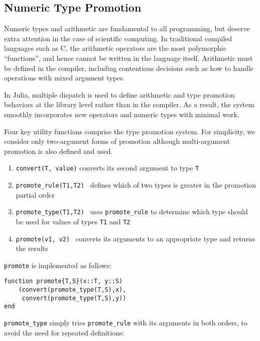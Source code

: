 \documentclass[9pt]{sigplanconf}
\begin{document}

\subsection{Numeric Type Promotion}

Numeric types and arithmetic are fundamental to all programming, but deserve
extra attention in the case of scientific computing.
In traditional compiled languages such as C, the arithmetic operators are the
most polymorphic ``functions'', and hence cannot be written in the language
itself. Arithmetic must be defined in the compiler, including contentious
decisions such as how to handle operations with mixed argument types.

In Julia, multiple dispatch is used to define arithmetic and type
promotion behaviors at the library level rather than in the compiler.
As a result, the system smoothly incorporates new
operators and numeric types with minimal work.

Four key utility functions comprise the type promotion system.
For simplicity, we consider only two-argument forms of promotion
although multi-argument promotion is also defined and used.

\begin{enumerate}
\item {\tt convert(T, value)} converts its second argument to type {\tt T}
\item {\tt promote\_rule(T1,T2) } defines which of two types is greater in
the promotion partial order
\item {\tt promote\_type(T1,T2) } uses {\tt promote\_rule} to determine which
type should be used for values of types {\tt T1} and {\tt T2}
\item {\tt promote(v1, v2) } converts its arguments to an appropriate type
and returns the results
\end{enumerate}

{\tt promote} is implemented as follows:

\begin{verbatim}
function promote{T,S}(x::T, y::S)
    (convert(promote_type(T,S),x),
     convert(promote_type(T,S),y))
end
\end{verbatim}

{\tt promote\_type} simply tries {\tt promote\_rule} with its arguments in
both orders, to avoid the need for repeated definitions:
\end{document}
